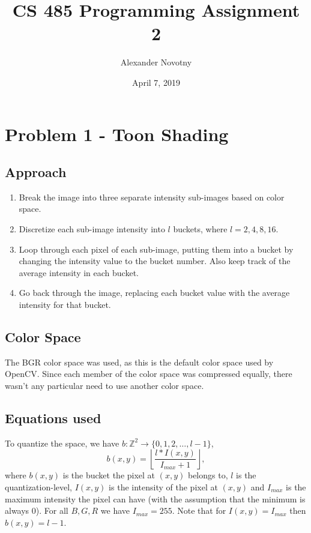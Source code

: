 \documentclass[dvipsnames]{article}
\title{CS 485 Programming Assignment 2}
\date{April 7, 2019}
\author{Alexander Novotny}
\newcommand{\ints}{\mathbb{Z}}
\begin{document}

\maketitle

\section*{Problem 1 - Toon Shading}
\subsection*{Approach}
\begin{enumerate}
	\item Break the image into three separate intensity sub-images based on color space.
	\item Discretize each sub-image intensity into $l$ buckets, where $l = 2,4,8,16$.
	\item Loop through each pixel of each sub-image, putting them into a bucket by changing the intensity value to the bucket number. Also keep track of the average intensity in each bucket.
	\item Go back through the image, replacing each bucket value with the average intensity for that bucket.
\end{enumerate}

\subsection*{Color Space}
The BGR color space was used, as this is the default color space used by OpenCV. Since each member of the color space was compressed equally, there wasn't any particular need to use another color space.

\subsection*{Equations used}
To quantize the space, we have $b : \ints^2 \to \{0,1,2,\dots,l-1\}$,
\begin{equation}
	b(x,y) = \left\lfloor\frac{l*I(x,y)}{I_{max} + 1}\right\rfloor,
\end{equation}
where $b(x,y)$ is the bucket the pixel at $(x,y)$ belongs to, $l$ is the quantization-level, $I(x,y)$ is the intensity of the pixel at $(x,y)$ and $I_{max}$ is the maximum intensity the pixel can have (with the assumption that the minimum is always 0). For all $B,G,R$ we have $I_{max} = 255$. Note that for $I(x,y) = I_{max}$ then $b(x,y) = l - 1$.\\
\end{document}
